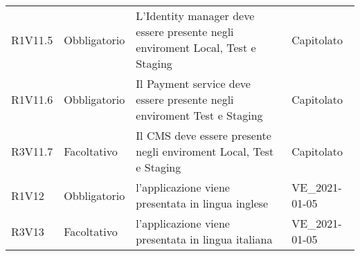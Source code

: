 {\begin{longtable}{C{2.5cm} C{2.8cm} C{6.7cm} C{2.5cm}}
R1V11.5 & Obbligatorio & L'Identity manager deve essere presente negli enviroment Local, Test e Staging & Capitolato \\
R1V11.6 & Obbligatorio & Il Payment service deve essere presente negli enviroment Test e Staging & Capitolato \\
R3V11.7 & Facoltativo & Il CMS deve essere presente negli enviroment Local, Test e Staging & Capitolato \\

R1V12 & Obbligatorio & l'applicazione viene presentata in lingua inglese & VE\_2021-01-05 \\
R3V13 & Facoltativo & l'applicazione viene presentata in lingua italiana & VE\_2021-01-05 \\

\end{longtable}

}